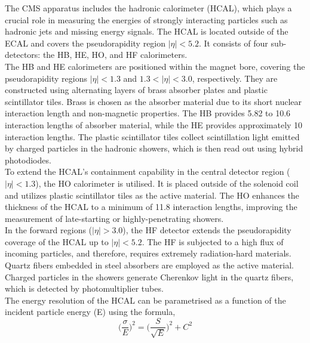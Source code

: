The \ac{CMS} apparatus includes the hadronic calorimeter (\ac{HCAL}), which plays a crucial role in measuring the energies of strongly interacting particles such as hadronic jets and missing energy signals. 
The \ac{HCAL} is located outside of the \ac{ECAL} and covers the pseudorapidity region $|\eta| < 5.2$. 
It consists of four sub-detectors: the \ac{HB}, \ac{HE}, \ac{HO}, and \ac{HF} calorimeters. \\

The \ac{HB} and \ac{HE} calorimeters are positioned within the magnet bore, covering the pseudorapidity regions $|\eta| < 1.3$ and $1.3 < |\eta| < 3.0$, respectively. 
They are constructed using alternating layers of brass absorber plates and plastic scintillator tiles. 
Brass is chosen as the absorber material due to its short nuclear interaction length and non-magnetic properties. 
The \ac{HB} provides 5.82 to 10.6 interaction lengths of absorber material, while the HE provides approximately 10 interaction lengths. 
The plastic scintillator tiles collect scintillation light emitted by charged particles in the hadronic showers, which is then read out using hybrid photodiodes. \\

To extend the \ac{HCAL}'s containment capability in the central detector region ($|\eta| < 1.3$), the HO calorimeter is utilised. 
It is placed outside of the solenoid coil and utilizes plastic scintillator tiles as the active material. 
The HO enhances the thickness of the \ac{HCAL} to a minimum of 11.8 interaction lengths, improving the measurement of late-starting or highly-penetrating showers. \\

In the forward regions ($|\eta| > 3.0$), the \ac{HF} detector extends the pseudorapidity coverage of the \ac{HCAL} up to $|\eta| < 5.2$. 
The \ac{HF} is subjected to a high flux of incoming particles, and therefore, requires extremely radiation-hard materials. 
Quartz fibers embedded in steel absorbers are employed as the active material. Charged particles in the showers generate Cherenkov light in the quartz fibers, which is detected by photomultiplier tubes. \\

The energy resolution of the \ac{HCAL} can be parametrised as a function of the incident particle energy (E) using the formula, 
\begin{equation}
\Big(\frac{\sigma}{E}\Big)^2 = \Big(\frac{S}{\sqrt{E}}\Big)^2 + C^2
\end{equation}


